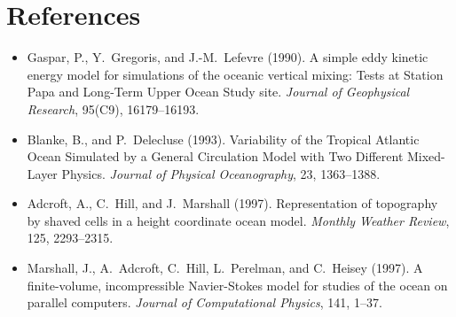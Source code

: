 \documentclass[11pt, a4paper]{article}
\begin{document}
\section{References}

\begin{itemize}
    \item Gaspar, P., Y.\ Gregoris, and J.-M.\ Lefevre (1990). A simple eddy kinetic energy model for simulations of the oceanic vertical mixing: Tests at Station Papa and Long-Term Upper Ocean Study site. \textit{Journal of Geophysical Research}, 95(C9), 16179–16193.
    
    \item Blanke, B., and P.\ Delecluse (1993). Variability of the Tropical Atlantic Ocean Simulated by a General Circulation Model with Two Different Mixed-Layer Physics. \textit{Journal of Physical Oceanography}, 23, 1363–1388.
    
    \item Adcroft, A., C.\ Hill, and J.\ Marshall (1997). Representation of topography by shaved cells in a height coordinate ocean model. \textit{Monthly Weather Review}, 125, 2293–2315.
    
    \item Marshall, J., A.\ Adcroft, C.\ Hill, L.\ Perelman, and C.\ Heisey (1997). A finite-volume, incompressible Navier-Stokes model for studies of the ocean on parallel computers. \textit{Journal of Computational Physics}, 141, 1–37.
\end{itemize}
\end{document}
